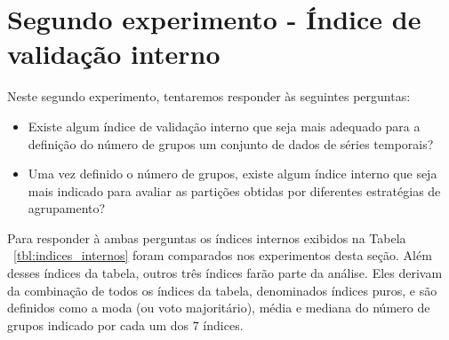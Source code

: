 \section{Segundo experimento - Índice de validação interno} \label{sec:definicao_indice_interno}

Neste segundo experimento, tentaremos responder às seguintes perguntas:

\begin{itemize}
	\item Existe algum índice de validação interno que seja mais adequado para a definição do número de grupos um conjunto de dados de séries temporais?
	\item Uma vez definido o número de grupos, existe algum índice interno que seja mais indicado para avaliar as partições obtidas por diferentes estratégias de agrupamento?
\end{itemize}

Para responder à ambas perguntas os índices internos exibidos na Tabela ~\ref{tbl:indices_internos} foram comparados nos experimentos desta seção. Além desses índices da tabela, outros três índices farão parte da análise. Eles derivam da combinação de todos os índices da tabela, denominados índices puros, e são definidos como a moda (ou voto majoritário), média e mediana do número de grupos indicado por cada um dos $7$ índices.

